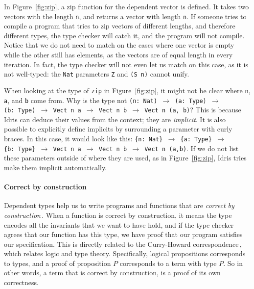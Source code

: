 In Figure~\ref{fig:zip}, a zip function for the dependent vector is defined. It takes two vectors with the length \texttt{n}, and returns a vector with length \texttt{n}. If someone tries to compile a program that tries to zip vectors of different lengths, and therefore different types, the type checker will catch it, and the program will not compile. Notice that we do not need to match on the cases where one vector is empty while the other still has elements, as the vectors are of equal length in every iteration. In fact, the type checker will not even let us match on this case, as it is not well-typed: the \texttt{Nat} parameters \texttt{Z} and \texttt{(S~n)} cannot unify.

When looking at the type of \texttt{zip} in Figure~\ref{fig:zip}, it might not be clear where \texttt{n}, \texttt{a}, and \texttt{b} come from. Why is the type not \texttt{(n:~Nat)~$\to$ (a:~Type)~$\to$ (b:~Type)~$\to$ Vect~n~a~$\to$ Vect~n~b~$\to$ Vect~n~(a,~b)}? This is because Idris can deduce their values from the context; they are \emph{implicit}. It is also possible to explicitly define implicits by surrounding a parameter with curly braces. In this case, it would look like this: \texttt{\{n:~Nat\}~$\to$ \{a:~Type\}~$\to$ \{b:~Type\}~$\to$ Vect~n~a~$\to$ Vect~n~b~$\to$ Vect~n~(a,b)}. If we do not list these parameters outside of where they are used, as in Figure~\ref{fig:zip}, Idris tries make them implicit automatically.

\paragraph{Correct by construction} Dependent types help us to write programs and functions that are \emph{correct by construction}\,\cite[p. 464]{Pierce:TypeSystems}. When a function is correct by construction, it means the type encodes all the invariants that we want to have hold, and if the type checker agrees that our function has this type, we have proof that our program satisfies our specification. This is directly related to the Curry-Howard correspondence\,\cite[pp. 108]{Pierce:TypeSystems}, which relates logic and type theory. Specifically, logical propositions corresponds to types, and a proof of proposition $P$ corresponds to a term with type $P$. So in other words, a term that is correct by construction, is a proof of its own correctness.

